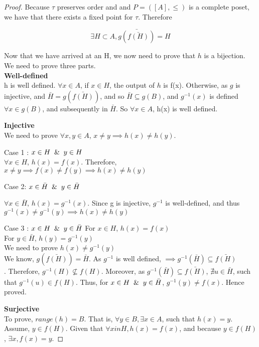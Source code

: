 \begin{proof}
Because $\tau$ preserves order and and $P = ([A],\le)$ is a complete poset, we have that there exists a fixed point for $\tau$. Therefore

$$ \exists H \subset A, \bar{g(\bar{f(H)})} = H $$

Now that we have arrived at an H, we now need to prove that $h$ is a bijection. We need to prove three parts. \\

\textbf{Well-defined} \\
h is well defined. $\forall x \in A$, if $x \in H$, the output of $h$ is f(x). Otherwise, as $g$ is injective, and $\bar H = g(\bar{f(H)})$, and so $\bar H \subseteq g(B)$, and $g^{-1}(x)$ is defined $\forall x \in g(B)$, and subsequently in $\bar H$. So $\forall x \in A$, h(x) is well defined.

\textbf{Injective}\\
We need to prove $\forall x,y \in A$, $x \ne y \implies h(x) \ne h(y)$.

\textsf{Case 1} : $x \in H \And y \in H$\\

$\forall x \in H$, $h(x) = f(x)$. Therefore, $x \ne y \implies f(x) \ne f(y) \implies h(x) \ne h(y) $


\textsf{Case 2}: $x \in \bar H \And y \in \bar H$

$\forall x \in \bar H$, $h(x) = g^{-1}(x)$.  Since g is injective, $g^{-1}$  is well-defined, and thus $g^{-1}(x) \ne g^{-1}(y) \implies h(x) \ne h(y)$

\textsf{Case 3} : $x \in H \And y \in \bar H$
For $x \in H$, $h(x) = f(x)$\\
For $y \in \bar H$, $h(y) = g^{-1}(y)$ \\

We need to prove $h(x) \ne g^{-1}(y)$ \\

We know, $g(\bar{f(H)}) = \bar H $. As $g^{-1}$ is well defined, $\implies g^{-1}(\bar H) \subseteq \bar{f(H)}$ \\. Therefore, $g^{-1}(H) \nsubseteq f(H)$. Moreover, as $g^{-1}(\bar H) \subseteq \bar{f(H)}$, $ \nexists u \in \bar H$, such that $g^{-1}(u) \in f(H)$.
Thus, for $x \in H \And y \in \bar H$, $g^{-1}(y) \ne f(x)$. Hence proved.

\textbf{Surjective} \\
To prove, $range(h) = B$. That is, $\forall y \in B, \exists x \in A$, such that $h(x) = y$. Assume, $y \in f(H)$. Given that $\forall x in H, h(x) = f(x)$, and because $y \in f(H)$, $\exists x, f(x) = y$.


\end{proof}
